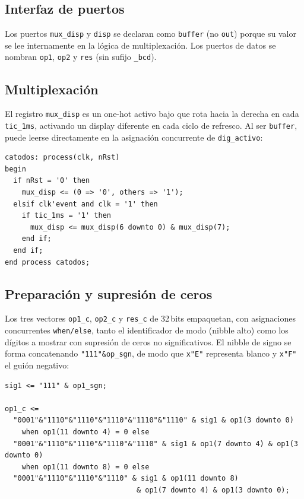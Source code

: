 \documentclass[memoria_final]{subfiles}
\begin{document}
\subsection{Interfaz de puertos}

Los puertos \texttt{mux\_disp} y \texttt{disp} se declaran como \texttt{buffer}
(no \texttt{out}) porque su valor se lee internamente en la lógica de
multiplexación. Los puertos de datos se nombran \texttt{op1}, \texttt{op2}
y \texttt{res} (sin sufijo \texttt{\_bcd}).

\subsection{Multiplexación}

El registro \texttt{mux\_disp} es un one-hot activo bajo que rota hacia la
derecha en cada \texttt{tic\_1ms}, activando un display diferente en cada
ciclo de refresco. Al ser \texttt{buffer}, puede leerse directamente en la
asignación concurrente de \texttt{dig\_activo}:

\begin{lstlisting}[caption={Registro de multiplexación en \texttt{displays.vhd}}]
catodos: process(clk, nRst)
begin
  if nRst = '0' then
    mux_disp <= (0 => '0', others => '1');
  elsif clk'event and clk = '1' then
    if tic_1ms = '1' then
      mux_disp <= mux_disp(6 downto 0) & mux_disp(7);
    end if;
  end if;
end process catodos;
\end{lstlisting}

\subsection{Preparación y supresión de ceros}

Los tres vectores \texttt{op1\_c}, \texttt{op2\_c} y \texttt{res\_c} de
32\,bits empaquetan, con asignaciones concurrentes \texttt{when/else}, tanto
el identificador de modo (nibble alto) como los dígitos a mostrar con
supresión de ceros no significativos. El nibble de signo se forma
concatenando \texttt{"111"\&op\_sgn}, de modo que \texttt{x"E"} representa
blanco y \texttt{x"F"} el guión negativo:

\begin{lstlisting}[caption={Supresión de ceros en \texttt{displays.vhd} (fragmento)}]
sig1 <= "111" & op1_sgn;

op1_c <=
  "0001"&"1110"&"1110"&"1110"&"1110"&"1110" & sig1 & op1(3 downto 0)
    when op1(11 downto 4) = 0 else
  "0001"&"1110"&"1110"&"1110"&"1110" & sig1 & op1(7 downto 4) & op1(3 downto 0)
    when op1(11 downto 8) = 0 else
  "0001"&"1110"&"1110"&"1110" & sig1 & op1(11 downto 8)
                               & op1(7 downto 4) & op1(3 downto 0);
\end{lstlisting}
\end{document}
